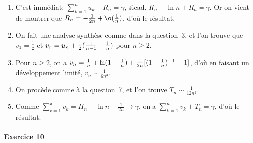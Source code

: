 \documentclass{yann}
\newcommand\Exo[1]{\paragraph{Exercice #1}}
\begin{document}
\begin{enumerate}
\item
  C'est immédiat: $∑_{k=1}^n u_k + R_n = γ$, £cad. $H_n - \ln n + R_n = γ$.
  Or on vient de montrer que $R_n = -\frac{1}{2n} + \o\pa{\frac1n}$, d'où le résultat.

\item
  On fait une analyse-synthèse comme dans la question~3,
  et l'on trouve que $v_1 = \frac12$ et $v_n = u_n + \frac12({ \frac{1}{n-1} - \frac{1}{n}  })$
  pour $n≥2$.

\item
  Pour $n ≥2$, on a
  $v_n = \frac1n + \ln({1-\frac1n}) + \frac{1}{2n}[{ ({1-\frac1n})^{-1} - 1 }]$,
  d'où en faisant un développement limité, $v_n \sim \frac{1}{6n^3}$.

\item
  On procède comme à la question~7, et l'on trouve $T_n \sim \frac{1}{12n^2}$.

\item
  Comme $∑_{k=1}^n v_k = H_n - \ln n - \frac{1}{2n} \to γ$,
  on a $∑_{k=1}^n v_k + T_n = γ$, d'où le résultat.

\end{enumerate}

\Exo{10}
\end{document}
